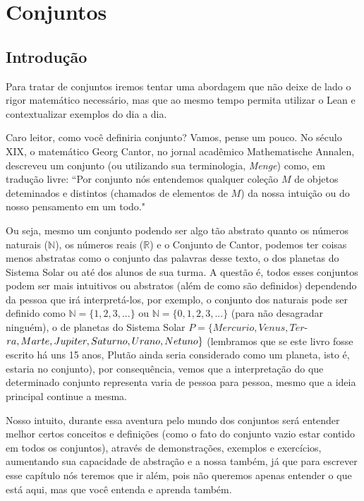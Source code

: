 \chapter{Conjuntos}
\section{Introdução}
Para tratar de conjuntos iremos tentar uma abordagem que não deixe de lado o rigor matemático necessário, mas que ao mesmo tempo permita utilizar o Lean e contextualizar exemplos do dia a dia.

Caro leitor, como você definiria conjunto? Vamos, pense um pouco. No século XIX, o matemático Georg Cantor, no jornal acadêmico Mathematische Annalen, descreveu um conjunto (ou utilizando sua terminologia, \textit{Menge}) como, em tradução livre: ``Por conjunto nós entendemos qualquer coleção $M$ de objetos deteminados e distintos (chamados de elementos de $M$) da nossa intuição ou do nosso pensamento em um todo."

Ou seja, mesmo um conjunto podendo ser algo tão abstrato quanto os números naturais ($\mathbb{N}$), os números reais ($\mathbb{R}$) e o Conjunto de Cantor, podemos ter coisas menos abstratas como o conjunto das palavras desse texto, o dos planetas do Sistema Solar ou até dos alunos de sua turma. A questão é, todos esses conjuntos podem ser mais intuitivos ou abstratos (além de como são definidos) dependendo da pessoa que irá interpretá-los, por exemplo, o conjunto dos naturais pode ser definido como $\mathbb{N} = \{1,2,3,...\}$ ou $\mathbb{N}=\{0,1,2,3,...\}$ (para não desagradar ninguém), o de planetas do Sistema Solar $ P = \{ Mercurio, Venus, Ter$-$\\ra, Marte, Jupiter, Saturno, Urano, Netuno \}$ (lembramos que se este livro fosse escrito há uns 15 anos, Plutão ainda seria considerado como um planeta, isto é, estaria no conjunto), por consequência, vemos que a interpretação do que determinado conjunto representa varia de pessoa para pessoa, mesmo que a ideia principal continue a mesma.

Nosso intuito, durante essa aventura pelo mundo dos conjuntos será entender melhor certos conceitos e definições (como o fato do conjunto vazio estar contido em todos os conjuntos), através de demonstrações, exemplos e exercícios, aumentando sua capacidade de abstração e a nossa também, já que para escrever esse capítulo nós teremos que ir além, pois não queremos apenas entender o que está aqui, mas que você entenda e aprenda também.

